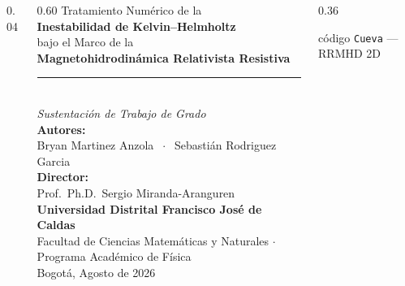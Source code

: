 \documentclass[aspectratio=169,9pt]{beamer}
\begin{document}
{\begin{frame}[plain]
\begin{columns}[T]
\begin{column}{0.04\textwidth}\end{column}
\begin{column}{0.60\textwidth}
  \vspace{0.55cm}
  {\color{soft}\normalsize Tratamiento Num\'erico de la}\\[2pt]
  {\color{white}\Large\bfseries Inestabilidad de Kelvin--Helmholtz}\\[2pt]
  {\color{soft}\normalsize bajo el Marco de la}\\[1pt]
  {\color{gold}\large\bfseries Magnetohidrodin\'amica Relativista Resistiva}\\[4pt]
  {\color{accent}\rule{0.96\linewidth}{1.5pt}}\\[4pt]
  {\color{INF8}\scriptsize\itshape Sustentaci\'on de Trabajo de Grado}
  \vspace{0.28cm}\\
  {\color{gold}\scriptsize\bfseries Autores:}\\[1pt]
  {\color{INF8}\scriptsize Bryan Martinez Anzola
    $\;\cdot\;$ Sebasti\'an Rodriguez Garcia}\\[3pt]
  {\color{gold}\scriptsize\bfseries Director:}\\[1pt]
  {\color{INF8}\scriptsize Prof.\ Ph.D.\ Sergio Miranda-Aranguren}
  \vspace{0.22cm}\\
  {\color{gold}\scriptsize\bfseries Universidad Distrital Francisco Jos\'e de Caldas}\\
  {\color{INF8!70}\tiny Facultad de Ciencias Matem\'aticas y Naturales
    $\cdot$ Programa Acad\'emico de F\'isica}\\[2pt]
  {\color{INF8!60}\tiny Bogot\'a, Agosto de 2026}
\end{column}
\begin{column}{0.36\textwidth}
  \vspace{0.3cm}
  \begin{center}
    {\color{INF8!50}\tiny c\'odigo \texttt{Cueva} --- RRMHD 2D}
  \end{center}
\end{column}
\end{columns}
\end{frame}
}
\end{document}
